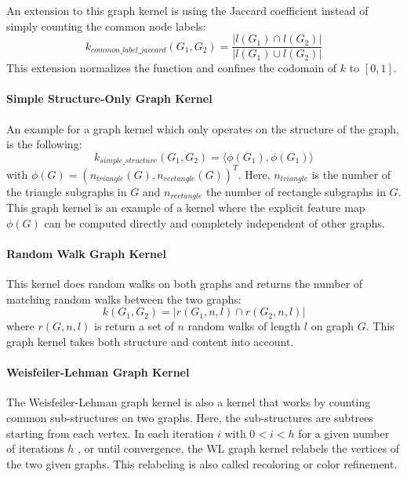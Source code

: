 An extension to this graph kernel is using the Jaccard coefficient instead of simply counting the common node labels:
\begin{equation*}
k_{common\_label\_jaccard}(G_1, G_2) = \frac{| l(G_1) \cap l(G_2) |}{| l(G_1) \cup l(G_2) |}
\end{equation*}
This extension normalizes the function and confines the codomain of $k$ to $[0, 1]$.

\paragraph{Simple Structure-Only Graph Kernel}
An example for a graph kernel which only operates on the structure of the graph, is the following:
\begin{equation*}
k_{simple\_structure}(G_1, G_2) = \langle \phi(G_1), \phi(G_1) \rangle
\end{equation*}
with $\phi(G) = (n_{triangle}(G), n_{rectangle}(G))^T$. Here, $n_{triangle}$ is the number of the triangle subgraphs in $G$ and $n_{rectangle}$ the number of rectangle subgraphs in $G$.
This graph kernel is an example of a kernel where the explicit feature map $\phi(G)$ can be computed directly and completely independent of other graphs.


\paragraph{Random Walk Graph Kernel}
This kernel does random walks on both graphs and returns the number of matching random walks between the two graphs:
\begin{equation*}
    k(G_1, G_2) = |r(G_1, n, l) \cap r(G_2, n, l)|
\end{equation*}
where $r(G, n, l)$ is return a set of $n$ random walks of length $l$ on graph $G$.
This graph kernel takes both structure and content into account.

\paragraph{Weisfeiler-Lehman Graph Kernel}
The Weisfeiler-Lehman graph kernel is also a kernel that works by counting common sub-structures on two graphs.
Here, the sub-structures are subtrees starting from each vertex.
In each iteration $i$ with $0 < i < h$ for a given number of iterations $h$ , or until convergence, the WL graph kernel relabels the vertices of the two given graphs.
This relabeling is also called recoloring or color refinement.

